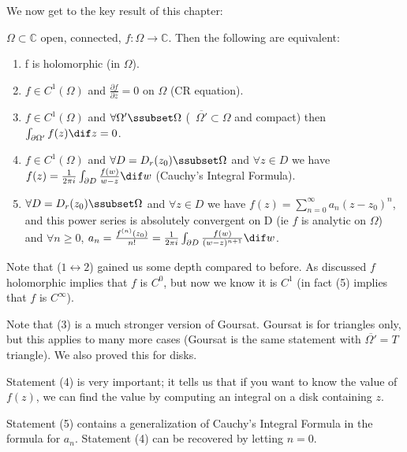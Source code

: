 We now get to the key result of this chapter:

\begin{theorem}
$\Omega \subset \mathbb{C}$ open, connected, $f:\Omega \rightarrow \mathbb{C}$. Then the following are equivalent:
\begin{enumerate}
    \item f is holomorphic (in $\Omega$).
    \item $f\in C^1(\Omega)$ and $\frac{\partial f}{\partial \overline{z}} = 0$ on $\Omega$ (CR equation).
    \item $f\in C^1(\Omega)$ and $\forall \Omega' \ssubset \Omega$ (\, $\overline{\Omega'} \subset \Omega$ and compact) then $\int_{\partial \Omega'} f(z) \dif z = 0$.
    \item $f\in C^1(\Omega)$ and $\forall D = D_r(z_0) \ssubset \Omega$ and $\forall z\in D$ we have $f(z) = \frac{1}{2\pi i} \int_{\partial D} \frac{f(w)}{w-z}  \dif w$ (Cauchy's Integral Formula).
    \item $\forall D = D_r(z_0) \ssubset \Omega$ and $\forall z\in D$ we have $f(z) = \sum_{n=0}^\infty a_n (z-z_0)^n$, and this power series is absolutely convergent on D (ie $f$ is analytic on $\Omega$) and $\forall n\geq 0$, $a_n = \frac{f^{(n)}(z_0) }{n!} = \frac{1}{2\pi i} \int_{\partial D} \frac{f(w)}{(w-z)^{n+1}}  \dif w$.
\end{enumerate}
\end{theorem}





\begin{note}
Note that ($1 \leftrightarrow 2$) gained us some depth compared to before. As discussed $f$ holomorphic implies that $f$ is $C^0$, but now we know it is $C^1$ (in fact (5) implies that $f$ is $C^\infty$).

Note that (3) is a much stronger version of Goursat. Goursat is for triangles only, but this applies to many more cases (Goursat is the same statement with $\overline{\Omega'}=T$ triangle). We also proved this for disks.

Statement (4) is very important; it tells us that if you want to know the value of $f(z)$, we can find the value by computing an integral on a disk containing $z$.

Statement (5) contains a generalization of Cauchy's Integral Formula in the formula for $a_n$. Statement (4) can be recovered by letting $n=0$.
\end{note}



